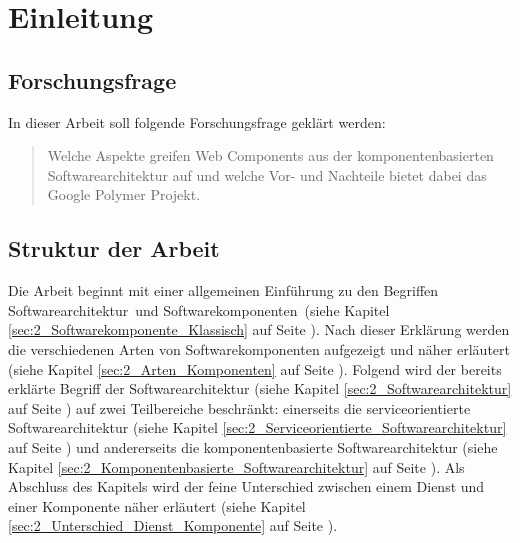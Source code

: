 \section{Einleitung}
\label{sec:1_Einführung}




\subsection{Forschungsfrage}
\label{sec:1_Forschungsfrage}
In dieser Arbeit soll folgende Forschungsfrage geklärt werden:
\begin{quote}
Welche Aspekte greifen Web Components aus der komponentenbasierten Softwarearchitektur auf und welche Vor- und Nachteile bietet dabei das Google Polymer Projekt.
\end{quote}

\subsection{Struktur der Arbeit}
\label{sec:1_Struktur}

Die Arbeit beginnt mit einer allgemeinen Einführung zu den Begriffen \glqq Softwarearchitektur\grqq\ und \glqq Softwarekomponenten\grqq\ (siehe Kapitel \ref{sec:2_Softwarekomponente_Klassisch} auf Seite \pageref{sec:2_Softwarekomponente_Klassisch}). Nach dieser Erklärung werden die verschiedenen Arten von Softwarekomponenten aufgezeigt und näher erläutert (siehe Kapitel \ref{sec:2_Arten_Komponenten} auf Seite \pageref{sec:2_Arten_Komponenten}). Folgend wird der bereits erklärte Begriff der Softwarearchitektur (siehe Kapitel \ref{sec:2_Softwarearchitektur} auf Seite \pageref{sec:2_Softwarearchitektur}) auf zwei Teilbereiche beschränkt: einerseits die serviceorientierte Softwarearchitektur (siehe Kapitel \ref{sec:2_Serviceorientierte_Softwarearchitektur} auf Seite \pageref{sec:2_Serviceorientierte_Softwarearchitektur}) und andererseits die komponentenbasierte Softwarearchitektur (siehe Kapitel \ref{sec:2_Komponentenbasierte_Softwarearchitektur} auf Seite \pageref{sec:2_Komponentenbasierte_Softwarearchitektur}). Als Abschluss des Kapitels wird der feine Unterschied zwischen einem Dienst und einer Komponente näher erläutert (siehe Kapitel \ref{sec:2_Unterschied_Dienst_Komponente} auf Seite \pageref{sec:2_Unterschied_Dienst_Komponente}).

